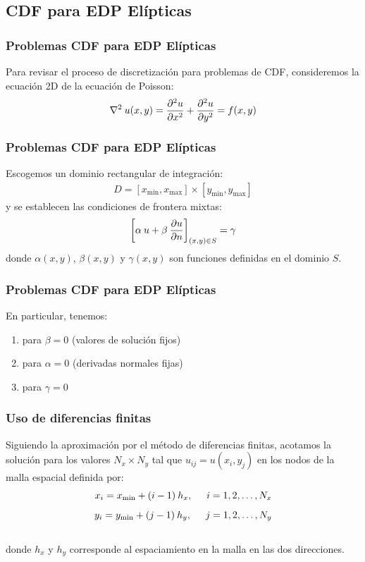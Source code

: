 \documentclass[12pt]{beamer}
\begin{document}
\subsection{CDF para EDP Elípticas}

\begin{frame}
\frametitle{Problemas CDF para EDP Elípticas}
Para revisar el proceso de discretización para problemas de CDF, consideremos la ecuación 2D de la ecuación de Poisson:
\pause
\begin{align}
\laplacian \: u (x, y) = \pdv[2]{u}{x} + \pdv[2]{u}{y} = f (x, y)
\label{eq:ecuacion_13_01}
\end{align}
\end{frame}
\begin{frame}
\frametitle{Problemas CDF para EDP Elípticas}
Escogemos un dominio rectangular de integración:
\pause
\begin{align*}
D = [x_{\text{min}}, x_{\text{max}} ] \times [y_{\text{min}}, y_{\text{max}} ]
\end{align*}
y se establecen las condiciones de frontera mixtas:
\pause
\begin{align}
\left[ \alpha \: u + \beta \: \pdv{u}{n} \right]_{(x, y) \in S} = \gamma
\label{eq:ecuacion_13_02}
\end{align}
donde $\alpha(x, y)$, $\beta(x, y)$ y $\gamma(x, y)$ son funciones definidas en el dominio $S$.
\end{frame}
\begin{frame}
\frametitle{Problemas CDF para EDP Elípticas}
En particular, tenemos:
\pause
{}
\begin{enumerate}[<+->]
\item {} para $\beta = 0$ (valores de solución fijos)
\item {} para $\alpha = 0$ (derivadas normales fijas)
\item {} para $\gamma = 0$
\end{enumerate}
\end{frame}
\begin{frame}
\frametitle{Uso de diferencias finitas}
Siguiendo la aproximación por el método de diferencias finitas, acotamos la solución para los valores $N_{x} \times N_{y}$ tal que $u_{ij} = u(x_{i}, y_{j})$ en los nodos de la malla espacial definida por:
\pause
\begin{align*}
x_{i} = x_{\text{min}} + (i - 1) \: h_{x}, \hspace{0.5cm} i = 1, 2, \ldots, N_{x} \\[0.5em]
y_{i} = y_{\text{min}} + (j - 1) \: h_{y}, \hspace{0.5cm} j = 1, 2, \ldots, N_{y}
\end{align*}
\\
\bigskip
\pause
donde $h_{x}$ y $h_{y}$ corresponde al espaciamiento en la malla en las dos direcciones.
\end{frame}
\end{document}
